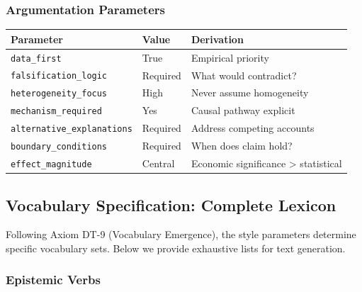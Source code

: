 \subsubsection{Argumentation Parameters}

\begin{center}
\renewcommand{\arraystretch}{1.2}
\begin{tabular}{lll}
\toprule
\textbf{Parameter} & \textbf{Value} & \textbf{Derivation} \\
\midrule
\texttt{data\_first} & True & Empirical priority \\
\texttt{falsification\_logic} & Required & What would contradict? \\
\texttt{heterogeneity\_focus} & High & Never assume homogeneity \\
\texttt{mechanism\_required} & Yes & Causal pathway explicit \\
\texttt{alternative\_explanations} & Required & Address competing accounts \\
\texttt{boundary\_conditions} & Required & When does claim hold? \\
\texttt{effect\_magnitude} & Central & Economic significance > statistical \\
\bottomrule
\end{tabular}
\end{center}

\subsection{Vocabulary Specification: Complete Lexicon}

Following Axiom DT-9 (Vocabulary Emergence), the style parameters determine
specific vocabulary sets. Below we provide exhaustive lists for text generation.

\subsubsection{Epistemic Verbs}

